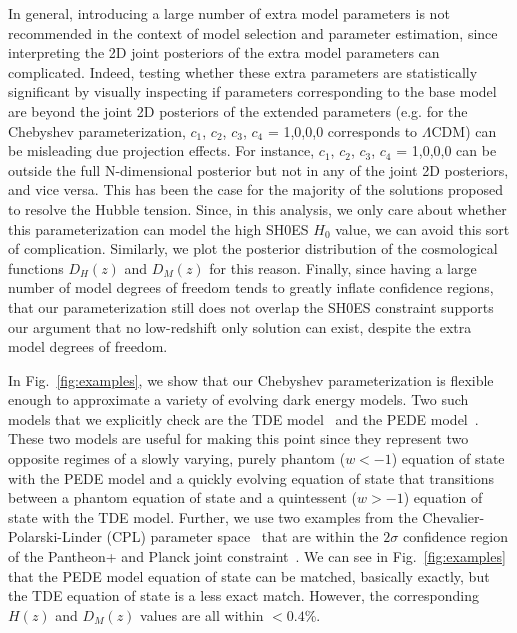 \documentclass[
 reprint,
 amsmath,amssymb,
 aps,
]{revtex4-2}
\begin{document}
In general, introducing a large number of extra model parameters is not recommended in the context of model selection and parameter estimation, since interpreting the 2D joint posteriors of the extra model parameters can complicated. Indeed, testing whether these extra parameters are statistically significant by visually inspecting if parameters corresponding to the base model are beyond the joint 2D posteriors of the extended parameters (e.g. for the Chebyshev parameterization, {$c_1$, $c_2$, $c_3$, $c_4$} = {1,0,0,0} corresponds to $\Lambda$CDM) can be misleading due projection effects.  For instance, {$c_1$, $c_2$, $c_3$, $c_4$} = {1,0,0,0} can be outside the full N-dimensional posterior but not in any of the joint 2D posteriors, and vice versa. This has been the case for the majority of the solutions proposed to resolve the Hubble tension. Since, in this analysis, we only care about whether this parameterization can model the high SH0ES $H_0$ value, we can avoid this sort of complication. Similarly, we plot the posterior distribution of the cosmological functions $D_H(z)$ and $D_M(z)$ for this reason. Finally, since having a large number of model degrees of freedom tends to greatly inflate confidence regions, that our parameterization still does not overlap the SH0ES constraint supports our argument that no low-redshift only solution can exist, despite the extra model degrees of freedom.  

In Fig.~\ref{fig:examples}, we show that our Chebyshev parameterization is flexible enough to approximate a variety of evolving dark energy models.  Two such models that we explicitly check are the TDE model~\cite{2019JCAP...12..035K} and the PEDE model~\cite{Li:2019yem}.  These two models are useful for making this point since they represent two opposite regimes of a slowly varying, purely phantom ($w<-1$) equation of state with the PEDE model and a quickly evolving equation of state that transitions between a phantom equation of state and a quintessent ($w>-1$) equation of state with the TDE model. Further, we use two examples from the Chevalier-Polarski-Linder (CPL) parameter space~\cite{Chevallier:2000qy,Linder:2002et} that are within the $2\sigma$ confidence region of the Pantheon+ and Planck joint constraint~\cite{Brout:2022vxf}.  We can see in Fig.~\ref{fig:examples} that the PEDE model equation of state can be matched, basically exactly, but the TDE equation of state is a less exact match. However, the corresponding $H(z)$ and $D_M(z)$ values are all within $<0.4$\%.    
\end{document}
